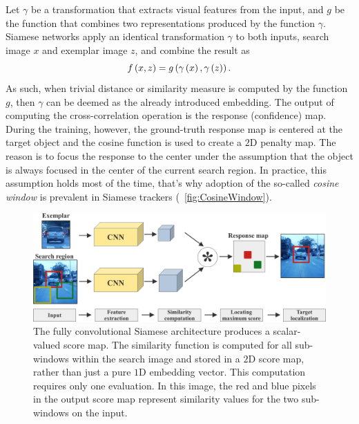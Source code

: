Let $\gamma$ be a transformation that extracts visual features from the input, and $g$ be the function that combines two representations produced by the function $\gamma$. Siamese networks apply an identical transformation $\gamma$ to both inputs, search image $x$ and exemplar image $z$, and combine the result as
\begin{equation}
    {f} \left( x, z \right) = {g} \left( {\gamma} \left( x \right), {\gamma} \left( z \right) \right).
\end{equation}
As such, when trivial distance or similarity measure is computed by the function $g$, then $\gamma$ can be deemed as the already introduced embedding. The output of computing the cross-correlation operation is the response (confidence) map. During the training, however, the ground-truth response map is centered at the target object and the cosine function is used to create a $2$D penalty map. The reason is to focus the response to the center under the assumption that the object is always focused in the center of the current search region. In practice, this assumption holds most of the time, that's why adoption of the so-called \emph{cosine window} is prevalent in Siamese trackers (\figtext{}~\ref{fig:CosineWindow}).

\begin{figure}[!t]
    \centerline{\includegraphics[width=0.9\linewidth]{figures/theoretical_foundations/fully_cnn_siam_tracking_architecture.pdf}}
    \caption[\Gls{siamfc} architecture]{The fully convolutional Siamese architecture produces a scalar-valued score map. The similarity function is computed for all sub-windows within the search image and stored in a $2$D score map, rather than just a pure $1$D embedding vector. This computation requires only one evaluation. In this image, the red and blue pixels in the output score map represent similarity values for the two sub-windows on the input.}
    \label{fig:FullyCNNSiamTrackingArch}
\end{figure}

